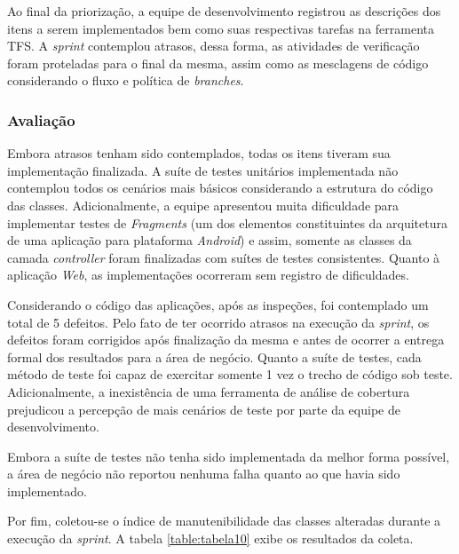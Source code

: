 Ao final da priorização, a equipe de desenvolvimento registrou as descrições dos itens a serem implementados bem como suas respectivas tarefas na ferramenta TFS. A \textit{sprint} contemplou atrasos, dessa forma, as atividades de verificação foram proteladas para o final da mesma, assim como as mesclagens de código considerando o fluxo e política de \textit{branches}.

\subsubsection{Avaliação}

Embora atrasos tenham sido contemplados, todas os itens tiveram sua implementação finalizada. A suíte de testes unitários implementada não contemplou todos os cenários mais básicos considerando a estrutura do código das classes. Adicionalmente, a equipe apresentou muita dificuldade para implementar testes de \textit{Fragments} (um dos elementos constituintes da arquitetura de uma aplicação para plataforma \textit{Android}) e assim, somente as classes da camada \textit{controller} foram finalizadas com suítes de testes consistentes. Quanto à aplicação \textit{Web}, as implementações ocorreram sem registro de dificuldades.

Considerando o código das aplicações, após as inspeções, foi contemplado um total de 5 defeitos. Pelo fato de ter ocorrido atrasos na execução da \textit{sprint}, os defeitos foram corrigidos após finalização da mesma e antes de ocorrer a entrega formal dos resultados para a área de negócio. Quanto a suíte de testes, cada método de teste foi capaz de exercitar somente 1 vez o trecho de código sob teste. Adicionalmente, a inexistência de uma ferramenta de análise de cobertura prejudicou a percepção de mais cenários de teste por parte da equipe de desenvolvimento.

Embora a suíte de testes não tenha sido implementada da melhor forma possível, a área de negócio não reportou nenhuma falha quanto ao que havia sido implementado.

Por fim, coletou-se o índice de manutenibilidade das classes alteradas durante a execução da \textit{sprint}. A tabela \ref{table:tabela10} exibe os resultados da coleta.

